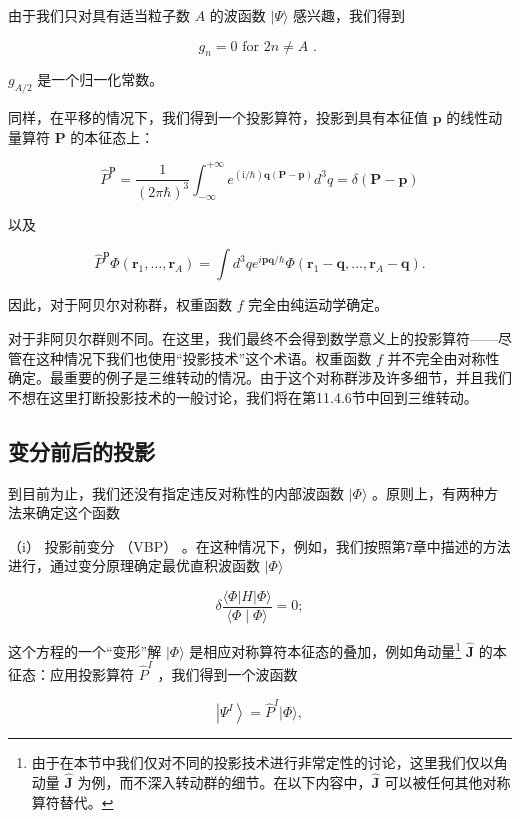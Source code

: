 由于我们只对具有适当粒子数 $A$ 的波函数 $|\Psi\rangle$ 感兴趣，我们得到

\[
{g}_{n}=0\text{ for }{2n}\neq A\text{ . }
\]

${g}_{A/2}$ 是一个归一化常数。

同样，在平移的情况下，我们得到一个投影算符，投影到具有本征值 $\boldsymbol{p}$ 的线性动量算符 $\boldsymbol{P}$
的本征态上：

\[
{\widehat{P}}^{\boldsymbol{p}}=\frac{1}{{\left(2\pi\hbar\right)}^{3}}{\int}^{+\infty}_{-\infty}{e}^{\left({\mathrm{i}/\hbar}\right)\boldsymbol{q}\left({\boldsymbol{P}-\boldsymbol{p}}\right)}{d}^{3}q=\delta\left({\boldsymbol{P}-\boldsymbol{p}}\right)\tag{11.59}
\]

以及

\[
{\widehat{P}}^{\boldsymbol{p}}\Phi\left({{\boldsymbol{r}}_{1},\ldots,{\boldsymbol{r}}_{A}}\right)=\int{d}^{3}q{e}^{i\boldsymbol{{pq}}/\hbar}\Phi\left({{\boldsymbol{r}}_{1}-\boldsymbol{q},\ldots,{\boldsymbol{r}}_{A}-\boldsymbol{q}}\right).
\]

因此，对于阿贝尔对称群，权重函数 $f$ 完全由纯运动学确定。

对于非阿贝尔群则不同。在这里，我们最终不会得到数学意义上的投影算符——尽管在这种情况下我们也使用“投影技术”这个术语。权重函数 $f$
并不完全由对称性确定。最重要的例子是三维转动的情况。由于这个对称群涉及许多细节，并且我们不想在这里打断投影技术的一般讨论，我们将在第11.4.6节中回到三维转动。

\subsection{变分前后的投影}

到目前为止，我们还没有指定违反对称性的内部波函数 $|\Phi\rangle$ 。原则上，有两种方法来确定这个函数

（i） 投影前变分 （VBP） \cite{PY57}。在这种情况下，例如，我们按照第7章中描述的方法进行，通过变分原理确定最优直积波函数
$|\Phi\rangle$

\[
\delta\frac{\langle\Phi\left|H\right|\Phi\rangle}{\langle\Phi\mid\Phi\rangle}=0;\tag{11.60}
\]

这个方程的一个“变形”解 $|\Phi\rangle$ 是相应对称算符本征态的叠加，例如角动量\footnote{由于在本节中我们仅对不同的投影技术进行非常定性的讨论，这里我们仅以角动量 $\hat{\boldsymbol{J}}$ 为例，而不深入转动群的细节。在以下内容中，$\hat{\boldsymbol{J}}$
可以被任何其他对称算符替代。} $\hat{\boldsymbol{J}}$ 的本征态：应用投影算符 ${\widehat{P}}^{I}$ ，我们得到一个波函数

\[
\left|{\Psi}^{I}\right\rangle ={\widehat{P}}^{I}|\Phi\rangle,\tag{11.61}
\]

